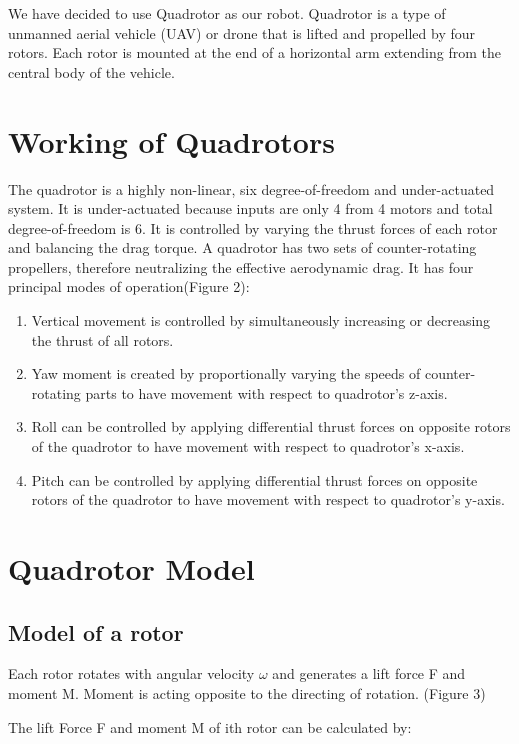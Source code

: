 
We have decided to use Quadrotor as our robot. Quadrotor is a type of unmanned aerial vehicle (UAV) or drone that is lifted and propelled by four rotors. Each rotor is mounted at the end of a horizontal arm extending from the central body of the vehicle. 

\section{Working of Quadrotors}

The quadrotor is a highly non-linear, six degree-of-freedom and under-actuated system. It is under-actuated because inputs are only 4 from 4 motors and total degree-of-freedom is 6. It is controlled by varying the thrust forces of each rotor and balancing the drag torque. A quadrotor has two sets of counter-rotating propellers, therefore neutralizing the effective aerodynamic drag. It has four principal modes of operation(Figure 2): 
\begin{enumerate}
\item Vertical movement is controlled by simultaneously increasing or decreasing the thrust of all rotors.
\item Yaw moment is created by proportionally varying the speeds of counter-rotating parts to have movement with respect to quadrotor's z-axis.
\item Roll can be controlled by applying differential thrust forces on opposite rotors of the quadrotor to have movement with respect to quadrotor's x-axis.
\item Pitch can be controlled by applying differential thrust forces on opposite rotors of the quadrotor to have movement with respect to quadrotor's y-axis.
\end{enumerate}


\section{Quadrotor Model}



\subsection{Model of a rotor}

Each rotor rotates with angular velocity $\omega$ and generates a lift force F and moment M. Moment is acting opposite to the directing of rotation. (Figure 3)


The lift Force F and moment M of ith rotor can be calculated by:

